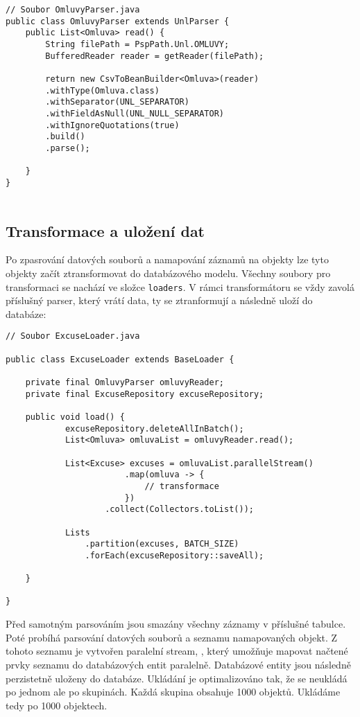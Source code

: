 \begin{lstlisting}[caption={Parsování datového souboru omluvy.unl}, tabsize=2]
// Soubor OmluvyParser.java
public class OmluvyParser extends UnlParser {
	public List<Omluva> read() {
		String filePath = PspPath.Unl.OMLUVY;
		BufferedReader reader = getReader(filePath);
		
		return new CsvToBeanBuilder<Omluva>(reader)
		.withType(Omluva.class)
		.withSeparator(UNL_SEPARATOR)
		.withFieldAsNull(UNL_NULL_SEPARATOR)
		.withIgnoreQuotations(true)
		.build()
		.parse();
		
	}
}
	
\end{lstlisting}

\subsection*{Transformace a uložení dat}
Po zpasrování datových souborů a namapování záznamů na objekty lze tyto objekty začít ztransformovat do databázového modelu. Všechny soubory pro transformaci se nachází ve složce \lstinline|loaders|. V rámci transformátoru se vždy zavolá příslušný parser, který vrátí data, ty se ztranformují \linebreak a následně uloží do databáze:

\begin{lstlisting}[caption={Transformace objektu Omluva na databázový objekt Excuse}, tabsize=2]
// Soubor ExcuseLoader.java
	
public class ExcuseLoader extends BaseLoader {

    private final OmluvyParser omluvyReader;
    private final ExcuseRepository excuseRepository;

    public void load() {
			excuseRepository.deleteAllInBatch();
			List<Omluva> omluvaList = omluvyReader.read();
			
			List<Excuse> excuses = omluvaList.parallelStream()
						.map(omluva -> {
							// transformace
						})
					.collect(Collectors.toList());
				
			Lists
				.partition(excuses, BATCH_SIZE)
				.forEach(excuseRepository::saveAll);

	}

}
\end{lstlisting}

\noindent 
Před samotným parsováním jsou smazány všechny záznamy v příslušné tabulce. Poté probíhá parsování datových souborů a seznamu namapovaných objekt. Z tohoto seznamu je vytvořen paralelní stream, , který umožňuje mapovat načtené prvky seznamu do databázových entit paralelně. Databázové entity jsou následně perzistetně uloženy do databáze. Ukládání je optimalizováno tak, že se neukládá po jednom ale po skupinách. Každá skupina obsahuje 1000 objektů. Ukládáme tedy po 1000 objektech.

